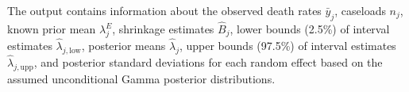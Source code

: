 \documentclass[article]{jss}
\begin{document}
The output contains information about the observed death rates $\bar{y}_{j}$, caseloads $n_{j}$, known prior mean $\lambda^E_j$, shrinkage estimates $\hat{B}_{j}$, lower bounds (2.5\%) of interval estimates $\hat{\lambda}_{j, \textrm{low}}$, posterior means $\hat{\lambda}_j$, upper bounds  (97.5\%) of interval estimates $\hat{\lambda}_{j, \textrm{upp}}$, and posterior standard deviations  for each random effect based on the assumed unconditional Gamma posterior distributions. %

\end{document}

